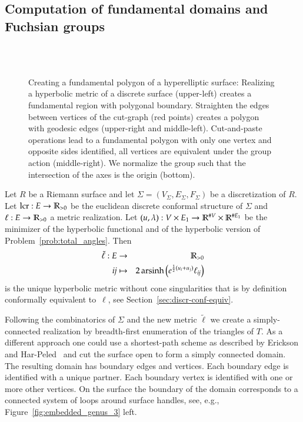 \documentclass[Thesis]{subfiles}
\begin{document}
\subsection{Computation of fundamental domains and Fuchsian groups}
\label{sec:fundamental_domains}

\begin{figure}
\centering
{}\\
\\
\caption{
Creating a fundamental polygon of a hyperelliptic surface:
Realizing a hyperbolic metric of a discrete surface (upper-left) creates a fundamental region with polygonal boundary.
Straighten the edges between vertices of the cut-graph (red points) creates a polygon with geodesic edges (upper-right and middle-left).
Cut-and-paste operations lead to a fundamental polygon with only one vertex and opposite sides identified, all vertices are equivalent under the group action (middle-right).
We normalize the group such that the intersection of the axes is the origin (bottom).
}
\label{fig:fundamental_polygon_algorithm}
\end{figure}

Let $R$ be a Riemann surface and let $\Sigma=(V_{\Sigma}, E_{\Sigma}, F_{\Sigma})$ be a discretization of $R$. 
Let $\operatorname{lcr} :E\to \mathbb R_{>0}$ be the euclidean discrete conformal structure of $\Sigma$ and $\ell:E\to \mathbb R_{>0}$ a metric realization. 
Let $(u, \lambda):V\times E_1\to \mathbb R^{\#V}\times\mathbb R^{\# E_1}$ be the minimizer of the hyperbolic functional and of the hyperbolic version of Problem~\ref{prob:total_angles}.
Then 
\begin{eqnarray}
\tilde \ell:E &\to& \mathbb R_{>0}\\
{\it ij}&\mapsto& 2\operatorname{arsinh}\left(e^{\frac{1}{2}(u_i+u_j)}\ell_{\it ij}\right)
\end{eqnarray}
is the unique hyperbolic metric without cone singularities that is by definition conformally equivalent to~$\ell$, see Section~\ref{sec:discr-conf-equiv}.

Following the combinatorics of $\Sigma$ and the new metric $\tilde \ell$ we create a simply-connected realization by breadth-first enumeration of the triangles of $T$. 
As a different approach one could use a shortest-path scheme as described by Erickson and Har-Peled~\cite{EricksonH02} and cut the surface open to form a simply connected domain.  
The resulting domain has boundary edges and vertices. 
Each boundary edge is identified with a unique partner. 
Each boundary vertex is identified with one or more other vertices. 
On the surface the boundary of the domain corresponds to a connected system of loops around surface handles, see, e.g., Figure~\ref{fig:embedded_genus_3} left.
\end{document}
